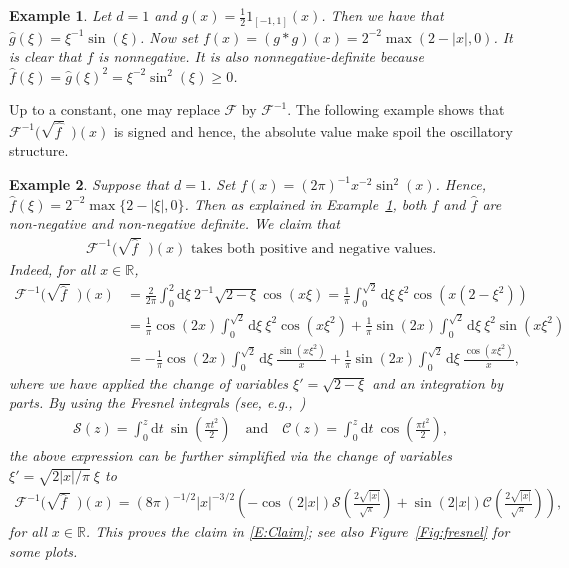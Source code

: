 \documentclass[sn-mathphys]{sn-jnl}%
\renewcommand{\R}{\mathbb{R}}
\newcommand{\ud}{\ensuremath{\mathrm{d}}}
\numberwithin{equation}{section}
\theoremstyle{thmstyleone}%
\theoremstyle{thmstyletwo}%
\newtheorem{example}{Example}[section]%
\theoremstyle{thmstylethree}%
\begin{document}
\begin{example}\label{Ex:nonnegative}
  Let $d = 1$ and $g(x) = \frac{1}{2}1_{[-1,1]}(x)$. Then we have that $ \widehat{g}(\xi) =
  \xi^{-1}\sin(\xi)$. Now set $f(x) = \left(g*g\right)(x) = 2^{-2}\max(2-\lvert x \rvert,0)$. It is clear that
  $f$ is nonnegative. It is also nonnegative-definite because $\widehat{f}(\xi) = \widehat{g}(\xi)^2
  = \xi^{-2}\sin^2 (\xi)\ge 0$.
\end{example}


Up to a constant, one may replace $\mathcal{F}$ by $\mathcal{F}^{-1}$. The following example shows
that $\mathcal{F}^{-1}\big(\sqrt{\widehat{f\:}}\:\:\big)(x)$ is signed and hence, the absolute value
make spoil the oscillatory structure.

\begin{example}\label{Ex:Finv}
  Suppose that $d = 1$. Set $f(x) = (2\pi)^{-1}x^{-2}\sin^2 (x)$. Hence, $\widehat{f}(\xi) =
  2^{-2}\max\{2-\lvert \xi \rvert,0\}$. Then as explained in Example~\ref{Ex:nonnegative}, both $f$ and
  $\widehat{f}$ are non-negative and non-negative definite. We claim that
	\begin{align}\label{E:Claim}
	\text{$\mathcal{F}^{-1}\big(\sqrt{\widehat{f}\:}\:\:\big)(x)$ takes both positive and negative values.}
	\end{align}
  Indeed, for all $x\in\R$,
	\begin{align*}
    \mathcal{F}^{-1}\big(\sqrt{\widehat{f}\:}\:\:\big)(x)
    & = \frac{2}{2\pi} \int_0^2 \ud \xi \: 2^{-1}\sqrt{2-\xi} \cos(x \xi)
      = \frac{1}{\pi} \int_0^{\sqrt{2}} \ud\xi\: \xi^2 \cos\left(x\left(2-\xi^2\right)\right)  \\
    & = \frac{1}{\pi}\cos(2x) \int_0^{\sqrt{2}} \ud\xi\: \xi^2 \cos(x \xi^2) + \frac{1}{\pi} \sin(2x) \int_0^{\sqrt{2}} \ud\xi\: \xi^2 \sin(x \xi^2) \\
    & = - \frac{1}{\pi} \cos(2x) \int_0^{\sqrt{2}} \ud\xi\: \frac{\sin(x \xi^2)}{x} + \frac{1}{\pi} \sin(2x) \int_0^{\sqrt{2}} \ud\xi\: \frac{\cos(x \xi^2)}{x},
  \end{align*}
  where we have applied the change of variables $\xi' = \sqrt{2 - \xi}$ and an integration by parts.
  By using the \textit{Fresnel integrals} (see, e.g.,~\cite[7.2 (iii)]{olver.lozier.ea:10:nist})
  \begin{align*}
    \mathcal{S}(z) = \int_0^{z} \ud t\: \sin\left(\frac{\pi t^2}{2}\right) \quad \text{and} \quad
    \mathcal{C}(z) = \int_0^z \ud t\: \cos\left(\frac{\pi t^2}{2}\right),
	\end{align*}
  the above expression can be further simplified via the change of variables $\xi' = \sqrt{2\lvert x \rvert/\pi}
  \: \xi$ to
	\begin{align*}
    \mathcal{F}^{-1}\big(\sqrt{\widehat{f}\:}\:\:\big)(x)
    = (8\pi)^{-1/2} \lvert x \rvert^{-3/2} \left(
      -\cos(2\left\lvert x\right\rvert) \mathcal{S}\left(\frac{2\sqrt{\lvert x \rvert}}{\sqrt{\pi}}\right)
      +\sin(2\left\lvert x\right\rvert) \mathcal{C}\left(\frac{2\sqrt{\lvert x \rvert}}{\sqrt{\pi}}\right)
    \right),
	\end{align*}
  for all $x\in\R$. This proves the claim in \eqref{E:Claim}; see also Figure~\ref{Fig:fresnel} for
  some plots.
\end{example}
\end{document}
